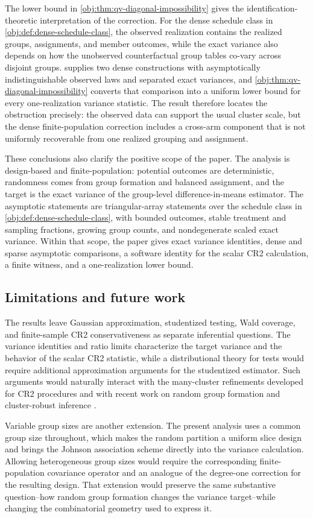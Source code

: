 The lower bound in \cref{obj:thm:qv-diagonal-impossibility} gives the identification-theoretic interpretation of the correction. For the dense schedule class in \cref{obj:def:dense-schedule-class}, the observed realization contains the realized groups, assignments, and member outcomes, while the exact variance also depends on how the unobserved counterfactual group tables co-vary across disjoint groups.  supplies two dense constructions with asymptotically indistinguishable observed laws and separated exact variances, and \cref{obj:thm:qv-diagonal-impossibility} converts that comparison into a uniform lower bound for every one-realization variance statistic. The result therefore locates the obstruction precisely: the observed data can support the usual cluster scale, but the dense finite-population correction includes a cross-arm component that is not uniformly recoverable from one realized grouping and assignment.

These conclusions also clarify the positive scope of the paper. The analysis is design-based and finite-population: potential outcomes are deterministic, randomness comes from group formation and balanced assignment, and the target is the exact variance of the group-level difference-in-means estimator. The asymptotic statements are triangular-array statements over the schedule class in \cref{obj:def:dense-schedule-class}, with bounded outcomes, stable treatment and sampling fractions, growing group counts, and nondegenerate scaled exact variance. Within that scope, the paper gives exact variance identities, dense and sparse asymptotic comparisons, a software identity for the scalar CR2 calculation, a finite witness, and a one-realization lower bound.

\subsection{Limitations and future work}

The results leave Gaussian approximation, studentized testing, Wald coverage, and finite-sample CR2 conservativeness as separate inferential questions. The variance identities and ratio limits characterize the target variance and the behavior of the scalar CR2 statistic, while a distributional theory for tests would require additional approximation arguments for the studentized estimator. Such arguments would naturally interact with the many-cluster refinements developed for CR2 procedures \citep{PustejovskyTipton2018} and with recent work on random group formation and cluster-robust inference \citep{FuSamiiWang2026}.

Variable group sizes are another extension. The present analysis uses a common group size throughout, which makes the random partition a uniform slice design and brings the Johnson association scheme directly into the variance calculation. Allowing heterogeneous group sizes would require the corresponding finite-population covariance operator and an analogue of the degree-one correction for the resulting design. That extension would preserve the same substantive question--how random group formation changes the variance target--while changing the combinatorial geometry used to express it.
